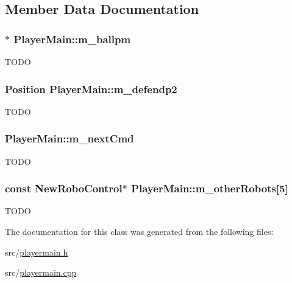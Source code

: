 \subsection{Member Data Documentation}
\hypertarget{classPlayerMain_aea071084f1a844ceafac3621ffb5c320}{
\subsubsection[{m\_\-ballpm}]{$\ast$ {\bf PlayerMain::m\_\-ballpm}}}
\label{classPlayerMain_aea071084f1a844ceafac3621ffb5c320}
TODO \hypertarget{classPlayerMain_a859b462c123135acc3ad88b092429611}{
\subsubsection[{m\_\-defendp2}]{\setlength{\rightskip}{0pt plus 5cm}Position {\bf PlayerMain::m\_\-defendp2}}}
\label{classPlayerMain_a859b462c123135acc3ad88b092429611}
TODO \hypertarget{classPlayerMain_a038f8616ec79dd26bae8039b6ada8321}{
\subsubsection[{m\_\-nextCmd}]{ {\bf PlayerMain::m\_\-nextCmd}}}
\label{classPlayerMain_a038f8616ec79dd26bae8039b6ada8321}
TODO \hypertarget{classPlayerMain_a020813a869e52dc7368ba9216b10e3d8}{
\subsubsection[{m\_\-otherRobots}]{\setlength{\rightskip}{0pt plus 5cm}const {\bf NewRoboControl}$\ast$ {\bf PlayerMain::m\_\-otherRobots}\mbox{[}5\mbox{]}}}
\label{classPlayerMain_a020813a869e52dc7368ba9216b10e3d8}
TODO 

The documentation for this class was generated from the following files:\begin{DoxyCompactItemize}
\item 
src/\hyperlink{playermain_8h}{playermain.h}\item 
src/\hyperlink{playermain_8cpp}{playermain.cpp}\end{DoxyCompactItemize}
